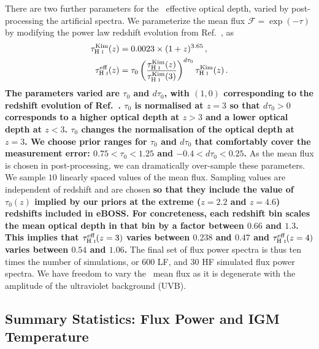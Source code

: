 There are two further parameters for the \Lya~effective optical depth, varied by post-processing the artificial spectra.
We parameterize the mean flux $\mathcal{F} = \exp(-\tau)$ by modifying the power law redshift evolution from Ref.~\cite{2007MNRAS.382.1657K}, as
\begin{align}
\tau^{\text{Kim}}_{\text{H~{\sc i}}}(z) &= 0.0023 \times (1+z)^{3.65}\,, \\
\tau^{\text{eff}}_{\text{H~{\sc i}}}(z) &= \tau_0 \left(\frac{\tau^{\text{Kim}}_{\text{H~{\sc i}}}(z)}{\tau^{\text{Kim}}_{\text{H~{\sc i}}}(3)}\right)^{d\tau_0} \tau^{\text{Kim}}_{\text{H~{\sc i}}}(z)\,.
 \label{eq:meanflux}
\end{align}
\textbf{The parameters varied are $\tau_0$ and $d\tau_0$, with $(1, 0)$ corresponding to the redshift evolution of Ref.~\cite{2007MNRAS.382.1657K}. $\tau_0$ is normalised at $z=3$ so that $d\tau_0 > 0$ corresponds to a higher optical depth at $z > 3$ and a lower optical depth at $z < 3$. $\tau_0$ changes the normalisation of the optical depth at $z=3$. We choose prior ranges for $\tau_0$ and $d\tau_0$ that comfortably cover the measurement error: $0.75 < \tau_0 < 1.25$ and $-0.4 < d\tau_0 < 0.25$.}
As the mean flux is chosen in post-processing, we can dramatically over-sample these parameters. We sample $10$ linearly spaced values of the mean flux. Sampling values are independent of redshift and are chosen \textbf{so that they include the value of $\tau_0(z)$ implied by our priors at the extreme ($z=2.2$ and $z=4.6$) redshifts included in eBOSS. For concreteness, each redshift bin scales the mean optical depth in that bin by a factor between $0.66$ and $1.3$. This implies that $\tau^{\text{eff}}_{\text{H~{\sc i}}}(z=3)$ varies between $ 0.238$ and $0.47$ and $\tau^{\text{eff}}_{\text{H~{\sc i}}}(z=4)$ varies between $0.54$ and $1.06$.}
The final set of flux power spectra is thus ten times the number of simulations, or $600$ LF, and $30$ HF simulated flux power spectra.
We have freedom to vary the \Lya~mean flux as it is degenerate with the amplitude of the ultraviolet background (UVB). 


\subsection{Summary Statistics: Flux Power and IGM Temperature}\label{sec:sim_fps}

